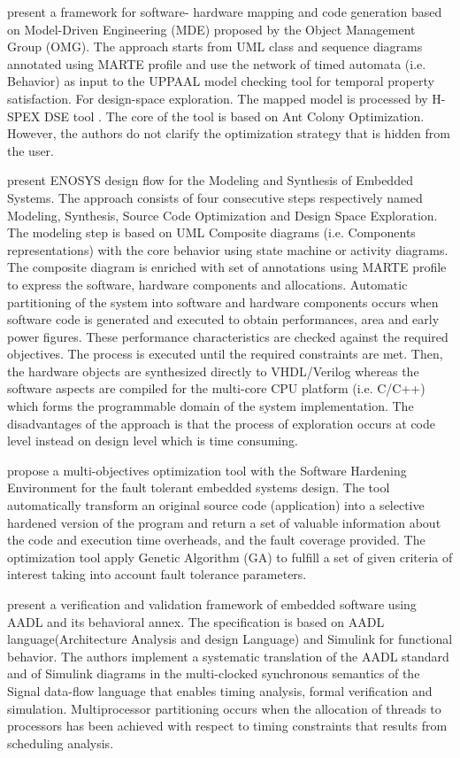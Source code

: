 \documentclass[3p,times,procedia,authoryear,round]{elsarticle}
\begin{document}
\cite{Nascimento2012} present a framework for software- hardware mapping and code generation based on Model-Driven Engineering (MDE) proposed by the Object Management Group (OMG). The approach starts from UML class and sequence diagrams annotated using MARTE profile and use the network of timed automata (i.e. Behavior) as input to the UPPAAL \citep{Behrmann2004} model checking tool for temporal property satisfaction. For design-space exploration. The mapped model is processed by H-SPEX DSE tool \citep{Oliveira2007}. The core of the tool is based on Ant Colony Optimization. However, the authors do not clarify the optimization strategy that is hidden from the user.   


\cite{Brosse2012} present ENOSYS design flow for the Modeling and Synthesis of Embedded Systems. The approach consists of four consecutive steps respectively named Modeling, Synthesis, Source Code Optimization and Design Space Exploration. The modeling step is based on UML Composite diagrams (i.e. Components representations) with the core behavior using state machine or activity diagrams. The composite diagram is enriched with set of annotations using MARTE profile to express the software, hardware components and allocations. Automatic partitioning of the system into software and hardware components occurs when software code is generated and  executed to obtain performances, area and early power figures. These performance characteristics are checked against the required objectives. The process is executed until the required constraints are met. Then, the hardware objects are synthesized directly to VHDL/Verilog whereas the software aspects are compiled for the multi-core CPU platform (i.e. C/C++) which forms the programmable domain of the system implementation. The disadvantages of the approach is that the process of exploration occurs at code level instead on design level which is time consuming. 


\cite{MartinezAlvarez20136813} propose a multi-objectives optimization tool with the Software Hardening Environment for the fault tolerant embedded systems design. The tool automatically transform an original source code (application) into a selective hardened version of the program and return a set of valuable information about the code and execution time overheads, and the fault coverage provided. The optimization tool apply Genetic Algorithm (GA) to fulfill a set of given criteria of interest taking into account fault tolerance parameters.


\cite{Besnard201554} present a verification and validation framework of embedded software using AADL and its behavioral annex. The specification is based on  AADL language(Architecture Analysis and design Language) \citep{5446809} and Simulink \citep{simulink} for functional behavior. The authors implement a systematic translation of the AADL standard and of Simulink diagrams in the multi-clocked synchronous semantics of the Signal data-flow language \citep{Ma2013} that enables timing analysis, formal verification and simulation. Multiprocessor partitioning occurs when the allocation of threads to processors has been achieved with respect to timing constraints that results from scheduling analysis.
\end{document}
